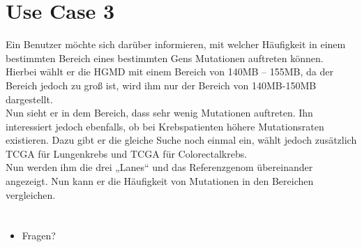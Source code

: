 \documentclass{beamer}
\begin{document}
\section{Use Case 3}
\begin{frame}
Ein Benutzer möchte sich darüber informieren, mit welcher Häufigkeit in einem bestimmten Bereich eines bestimmten Gens Mutationen auftreten können. Hierbei wählt er die HGMD mit einem Bereich von 140MB – 155MB, da der Bereich jedoch zu groß ist, wird ihm nur der Bereich von 140MB-150MB dargestellt.\\
Nun sieht er in dem Bereich, dass sehr wenig Mutationen auftreten. Ihn interessiert jedoch ebenfalls, ob bei Krebspatienten höhere Mutationsraten existieren. Dazu gibt er die gleiche Suche noch einmal ein, wählt jedoch zusätzlich TCGA für Lungenkrebs und TCGA für Colorectalkrebs.\\
Nun werden ihm die drei „Lanes“ und das Referenzgenom übereinander angezeigt. Nun kann er die Häufigkeit von Mutationen in den Bereichen vergleichen.
\end{frame}

\section{}
\begin{frame}
	\begin{itemize}
		\item Fragen?
	\end{itemize}
\end{frame}
\end{document}
